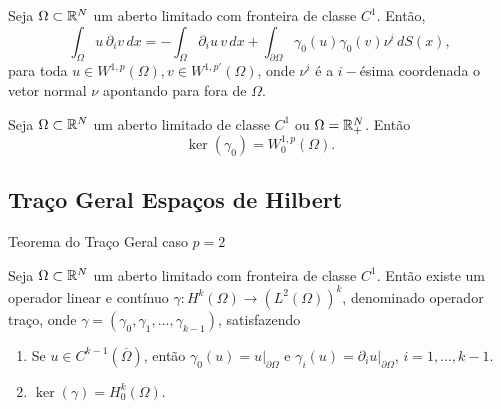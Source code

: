 
\begin{frame}
\begin{teo}
Seja \(\Omega\subset \mathbb{R}^N\) um {\color{blue} aberto limitado } {\color{red} com fronteira de classe \(C^1\)}. Então, 
\[
\int_\Omega u\,\partial_iv\, dx
=-\int_\Omega \partial_i u\, v\, dx
+\int_{\partial \Omega} \gamma_0(u)\gamma_0(v)\nu^i\, dS(x), 
\] 
para toda \(u\in W^{1,p}(\Omega), v\in W^{1,p'}(\Omega)\), onde \(\nu^i\) é a \(i-\)ésima coordenada o vetor normal \(\nu\) apontando para fora de \(\Omega\). 
\end{teo}


\begin{teo} 
Seja $\Omega\subset \mathbb{R}^N$ um {\color{red} aberto limitado {de classe $C^1$}} ou \(\Omega=\mathbb{R}^N_+\). Então
\[\ker( \gamma_0 )=W_0^{1,p}(\Omega).\]
\end{teo}

\end{frame}


\subsection*{Traço Geral Espaços de Hilbert}
\begin{frame}{Teorema do Traço Geral caso \(p=2\)}
\begin{teo}
Seja \(\Omega\subset \mathbb{R}^N\) um {\color{blue} aberto limitado } {\color{red} com fronteira de classe \(C^1\)}. Então existe um operador  linear e contínuo \(\gamma: H^k(\Omega)\longrightarrow (L^2(\Omega))^k\), denominado {\color{blue}operador traço}, onde \(\gamma=(\gamma_0,\gamma_1,\ldots,\gamma_{k-1})\), satisfazendo
\begin{enumerate}
\item Se \(u\in C^{k-1}(\overline{\Omega})\), então \(\gamma_0(u)=u\big\vert_{\partial \Omega}\) e  \(\gamma_i(u)=\partial_iu\big\vert_{\partial \Omega}\), \(i=1,\ldots,k-1\).

\item  \(\ker(\gamma)=H_0^k(\Omega).\)
\end{enumerate}
\end{teo}



\end{frame}


